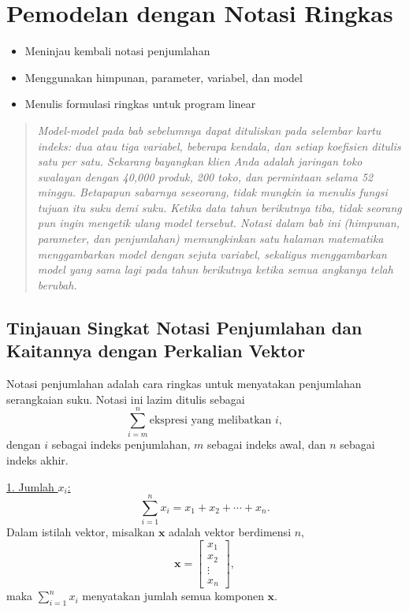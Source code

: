 \chapter{Pemodelan dengan Notasi Ringkas}

\begin{outcome}
\begin{itemize}
\item Meninjau kembali notasi penjumlahan
\item Menggunakan himpunan, parameter, variabel, dan model
\item Menulis formulasi ringkas untuk program linear
\end{itemize}
\end{outcome}

\begin{quote}
\itshape Model-model pada bab sebelumnya dapat dituliskan pada selembar kartu indeks: dua atau tiga variabel, beberapa kendala, dan setiap koefisien ditulis satu per satu. Sekarang bayangkan klien Anda adalah jaringan toko swalayan dengan 40{,}000 produk, 200 toko, dan permintaan selama 52 minggu. Betapapun sabarnya seseorang, tidak mungkin ia menulis fungsi tujuan itu suku demi suku. Ketika data tahun berikutnya tiba, tidak seorang pun ingin mengetik ulang model tersebut. Notasi dalam bab ini (himpunan, parameter, dan penjumlahan) memungkinkan satu halaman matematika menggambarkan model dengan sejuta variabel, sekaligus menggambarkan model yang sama lagi pada tahun berikutnya ketika semua angkanya telah berubah.
\end{quote}

\section*{Tinjauan Singkat Notasi Penjumlahan dan Kaitannya dengan Perkalian Vektor}

Notasi penjumlahan adalah cara ringkas untuk menyatakan penjumlahan serangkaian suku. Notasi ini lazim ditulis sebagai
\[
\sum_{i=m}^{n} \text{ekspresi yang melibatkan } i,
\]
dengan \(i\) sebagai indeks penjumlahan, \(m\) sebagai indeks awal, dan \(n\) sebagai indeks akhir.

\underline{1. Jumlah \(x_i\):}
\[
\sum_{i=1}^{n} x_i = x_1 + x_2 + \cdots + x_n.
\]
Dalam istilah vektor, misalkan \(\mathbf{x}\) adalah vektor berdimensi \(n\),
\[
\mathbf{x} = \begin{bmatrix} x_1 \\ x_2 \\ \vdots \\ x_n \end{bmatrix},
\]
maka \(\sum_{i=1}^{n} x_i\) menyatakan jumlah semua komponen \(\mathbf{x}\).

